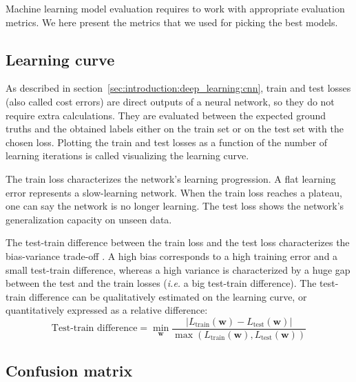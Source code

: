 Machine learning model evaluation requires to work with appropriate evaluation metrics. We here present the metrics that we used for picking the best models.

\subsection{Learning curve}

As described in section~\ref{sec:introduction:deep_learning:cnn}, train and test losses (also called cost errors) are direct outputs of a neural network, so they do not require extra calculations. They are evaluated between the expected ground truths and the obtained labels either on the train set or on the test set with the chosen loss. Plotting the train and test losses as a function of the number of learning iterations is called visualizing the learning curve.

The train loss characterizes the network's learning progression. A flat learning error represents a slow-learning network. When the train loss reaches a plateau, one can say the network is no longer learning. The test loss shows the network's generalization capacity on unseen data.

The test-train difference between the train loss and the test loss characterizes the bias-variance trade-off \parencite{geman1992neural}. A high bias corresponds to a high training error and a small test-train difference, whereas a high variance is characterized  by a huge gap between the test and the train losses (\textit{i.e.} a big test-train difference). The test-train difference can be qualitatively estimated on the learning curve, or quantitatively expressed as a relative difference:
\begin{equation}
\text{Test-train difference} = \min_{\mathbf{w}}\frac{|L_{\text{train}}(\mathbf{w}) - L_{\text{test}}(\mathbf{w})|}{\max\left(L_{\text{train}}(\mathbf{w}), L_{\text{test}}(\mathbf{w})\right)}
\end{equation}

\subsection{Confusion matrix}

